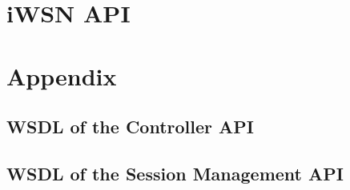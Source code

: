 \documentclass[a4paper,12pt]{article}
\begin{document}
    
  \prepareTitle
  \newpage
	
	\tableofcontents
	
	\pagestyle{fancy}
		
	
	
	
	
	
	\section{iWSN API}
		
		
		
		
		
		
	\sectionfin
	\section{Appendix}
	\label{sec:appendix}		

			\subsection{WSDL of the Controller API}
	

			\subsection{WSDL of the Session Management API}
	

\end{document}
